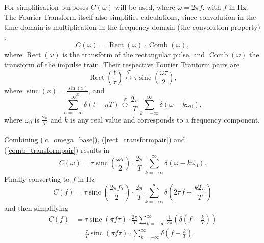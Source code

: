 \documentclass[a4paper, onecolumn, 12pt]{IEEEtran}
\begin{document}
For simplification purposes $C(\omega)$ will be used, where $\omega = 2\pi f$, with $f$ in Hz. The Fourier Transform itself also simplifies calculations, since convolution in the time domain is multiplication in the frequency domain (the convolution property) \cite{lathi}:
\begin{equation}\label{c_omega_base}
  C(\omega) = \operatorname{Rect}(\omega) \cdot \operatorname{Comb}(\omega),
\end{equation}
where $\operatorname{Rect}(\omega)$ is the transform of the rectangular pulse, and $\operatorname{Comb}(\omega)$ the transform of the impulse train. Their respective Fourier Tranform pairs are \cite{lathi}
\begin{equation} \label{rect_transformpair}
  \operatorname{Rect}(\frac{t}{\tau}) \overset{\mathcal{F}}{\longleftrightarrow} \tau\operatorname{sinc} (\frac{\omega \tau}{2}),
\end{equation}
where $\operatorname{sinc}(x)=\frac{\operatorname{sin}(x)}{x}$, and
\begin{equation}\label{comb_transformpair}
  \sum_{n=-\infty}^{\infty} \delta(t - nT) \overset{\mathcal{F}}{\longleftrightarrow} \frac{2\pi}{T} \sum_{k=-\infty}^{\infty} \delta(\omega - k\omega_0),
\end{equation}
where $\omega_0$ is $\frac{2\pi}{T}$ and $k$ is any real value and corresponds to a frequency component. \\
\\Combining (\ref{c_omega_base}), (\ref{rect_transformpair}) and (\ref{comb_transformpair}) results in 
\begin{equation} \label{c_omega}
  C(\omega) = \tau \operatorname{sinc}(\frac{\omega\tau}{2}) \cdot \frac{2\pi}{T} \sum_{k=-\infty}^{\infty} \delta(\omega - k\omega_0).
\end{equation}
Finally converting to $f$ in Hz
\begin{equation}
  C(f) = \tau\operatorname{sinc}(\frac{2\pi f\tau}{2}) \cdot \frac{2\pi}{T} \sum_{k=-\infty}^{\infty} \delta(2\pi f - \frac{k2\pi}{T})
\end{equation}
and then simplifying 
\begin{align} \label{cf_general}
  C(f) &= \tau\operatorname{sinc}(\pi f\tau) \cdot \frac{2\pi}{T}\sum_{k=-\infty}^{\infty}\frac{1}{2\pi}(\delta(f-\frac{k}{T})) \nonumber\\ 
       &= \frac{\tau}{T}\operatorname{sinc}(\pi f\tau) \cdot \sum_{k=-\infty}^{\infty}\delta(f-\frac{k}{T}).
\end{align}
\end{document}
